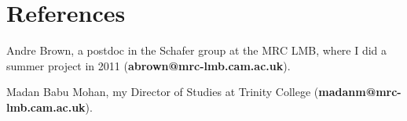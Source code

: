 \documentclass[letterpaper]{article}
\renewenvironment{itemize}{
  \begin{list}{}{
    \setlength{\leftmargin}{1.5em}
  }
}{
  \end{list}
}
\begin{document}
\section*{References}
\begin{itemize}
\item Andre Brown, a postdoc in the Schafer group at the MRC LMB, where I did a summer project in 2011 ({\bf abrown@mrc-lmb.cam.ac.uk}).
\item Madan Babu Mohan, my Director of Studies at Trinity College ({\bf madanm@mrc-lmb.cam.ac.uk}).
\end{itemize}

\bigskip

\begin{center}
\begin{footnotesize}
\end{footnotesize}
\end{center}
\end{document}
